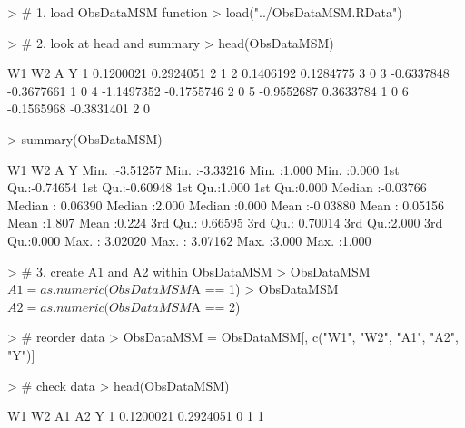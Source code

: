 \documentclass[answers]{exam}
\begin{document}
\begin{solution}
\begin{Schunk}
\begin{Sinput}
> # 1. load ObsDataMSM function
> load("../ObsDataMSM.RData")
\end{Sinput}
\end{Schunk}
\begin{Schunk}
\begin{Sinput}
> # 2. look at head and summary
> head(ObsDataMSM)
\end{Sinput}
\begin{Soutput}
          W1         W2 A Y
1  0.1200021  0.2924051 2 1
2  0.1406192  0.1284775 3 0
3 -0.6337848 -0.3677661 1 0
4 -1.1497352 -0.1755746 2 0
5 -0.9552687  0.3633784 1 0
6 -0.1565968 -0.3831401 2 0
\end{Soutput}
\begin{Sinput}
> summary(ObsDataMSM)
\end{Sinput}
\begin{Soutput}
       W1                 W2                 A               Y        
 Min.   :-3.51257   Min.   :-3.33216   Min.   :1.000   Min.   :0.000  
 1st Qu.:-0.74654   1st Qu.:-0.60948   1st Qu.:1.000   1st Qu.:0.000  
 Median :-0.03766   Median : 0.06390   Median :2.000   Median :0.000  
 Mean   :-0.03880   Mean   : 0.05156   Mean   :1.807   Mean   :0.224  
 3rd Qu.: 0.66595   3rd Qu.: 0.70014   3rd Qu.:2.000   3rd Qu.:0.000  
 Max.   : 3.02020   Max.   : 3.07162   Max.   :3.000   Max.   :1.000  
\end{Soutput}
\end{Schunk}
\begin{Schunk}
\begin{Sinput}
> # 3. create A1 and A2 within ObsDataMSM
> ObsDataMSM$A1 = as.numeric(ObsDataMSM$A == 1)
> ObsDataMSM$A2 = as.numeric(ObsDataMSM$A == 2)
\end{Sinput}
\end{Schunk}
\begin{Schunk}
\begin{Sinput}
> # reorder data
> ObsDataMSM = ObsDataMSM[, c("W1", "W2", "A1", "A2", "Y")]
\end{Sinput}
\end{Schunk}
\begin{Schunk}
\begin{Sinput}
> # check data
> head(ObsDataMSM)
\end{Sinput}
\begin{Soutput}
          W1         W2 A1 A2 Y
1  0.1200021  0.2924051  0  1 1

\end{Soutput}
\end{Schunk}
\end{solution}
\end{document}
